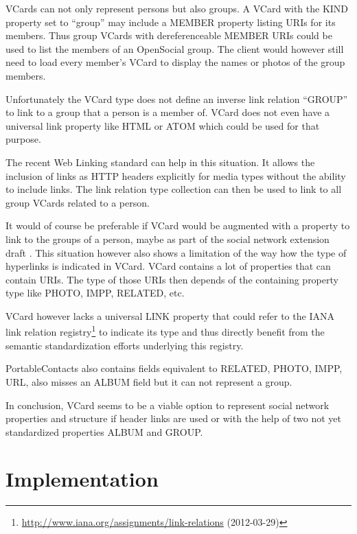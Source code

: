 \documentclass[11pt,a4paper,headsepline,twoside]{scrartcl}		%
\newcommand{\citeurl}[2]{\url{#1} (#2)}
\begin{document}
VCards can not only represent persons but also groups. A VCard with the KIND
property set to ``group'' may include a MEMBER property listing URIs for its
members. Thus group VCards with dereferenceable MEMBER URIs could be used to
list the members of an OpenSocial group. The client would however still need to
load every member's VCard to display the names or photos of the group members.

Unfortunately the VCard type does not define an inverse link relation ``GROUP''
to link to a group that a person is a member of. VCard does not even have a
universal link property like HTML or ATOM which could be used for that purpose.

The recent Web Linking standard \cite{RFC5988} can help in this situation. It
allows the inclusion of links as HTTP headers explicitly for media types without
the ability to include links. The link relation type
collection \cite{Amundsen2012} can then be used to link to all group VCards
related to a person.

It would of course be preferable if VCard would be augmented with a property to
link to the groups of a person, maybe as part of the social network extension
draft \cite{George2011}. This situation however also shows a limitation of the
way how the type of hyperlinks is indicated in VCard. VCard contains a lot of
properties that can contain URIs. The type of those URIs then depends of the
containing property type like PHOTO, IMPP, RELATED, etc.

VCard however lacks a universal LINK property that could refer to the IANA link
relation
registry\footnote{\citeurl{http://www.iana.org/assignments/link-relations}{2012-03-29}}
to indicate its type and thus directly benefit from the semantic standardization
efforts underlying this registry.

PortableContacts also contains fields equivalent to RELATED, PHOTO, IMPP, URL,
also misses an ALBUM field but it can not represent a group.

In conclusion, VCard seems to be a viable option to represent social network
properties and structure if header links are used or with the help of two not
yet standardized properties ALBUM and GROUP.

\section{Implementation}
\label{sec:implementation}

\end{document}

